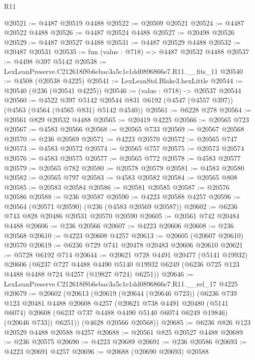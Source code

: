 \begin{lexlean}{R11}
\begin{coremodule}
@20521 := @4487 @20519 @4488
@20522 := @20509 @20521
@20524 := @4487 @20522 @4488
@20526 := @4487 @20524 @4488
@20527 := @20498 @20526
@20529 := @4487 @20527 @4488
@20531 := @4487 @20529 @4488
@20532 := @20487 @20531
@20535 := fun (value : @718) => @4487 @20532 @4488
@20537 := @4498 @397 @5142
@20538 := LexLeanPreserve.C212618f8b6ebac3a5c1e1dd0896866e7.R11.__fits_11
@20540 := @4508 (@20538 @4225)
@20541 := LexLeanStd.Blake3.hexLittle
@20544 := @20540 (@236 (@20541 @4225))
@20546 := (value : @718) -> @20537 @20544
@20560 := @4522
    @397
    @5142
    @20544
    @831
    @6192
    (@4547 (@4557 @397))
    (@4563 (@4564 (@4565 @831) @5142 @4540))
@20561 := @6228 @278
@20564 := @20561 @829 @20532 @4488
@20565 := @20419 @4225
@20566 := @20565 @723
@20567 := @4583 @20566
@20568 := @20565 @733
@20569 := @20567 @20568
@20570 := @236 @20569
@20571 := @4223 @20570
@20572 := @20565 @747
@20573 := @4583 @20572
@20574 := @20565 @757
@20575 := @20573 @20574
@20576 := @4583 @20575
@20577 := @20565 @772
@20578 := @4583 @20577
@20579 := @20565 @782
@20580 := @20578 @20579
@20581 := @4583 @20580
@20582 := @20565 @797
@20583 := @4583 @20582
@20584 := @20565 @808
@20585 := @20583 @20584
@20586 := @20581 @20585
@20587 := @20576 @20586
@20588 := @236 @20587
@20590 := @4223 @20588 @4257
@20596 := @20564 (@20571 @20590) (@236 (@4583 @20569 @20587))
@20602 := @6236 @743 @828 @20486 @20531 @20570 @20590
@20605 := @20561 @742 @20484 @4488
@20606 := @236 @20566
@20607 := @4223 @20606
@20608 := @236 @20568
@20610 := @4223 @20608 @4257
@20613 := @20605 (@20607 @20610) @20570
@20619 := @6236 @729 @741 @20478 @20483 @20606 @20610
@20621 := @5728 @6192 @714
@20644 := @20621
    @728
    @4491
    @20477
    (@5141 @19932)
    @20606
    (@6237
      @727
      @4488
      @4490
      @5140
      @19932
      @6249
      (@6236 @725 @123 @4488 @4488 @724 @4257 (@19827 @724) @6251))
@20646 := LexLeanPreserve.C212618f8b6ebac3a5c1e1dd0896866e7.R11.__rel_17 @4225
@20679 := @20602
    (@20613
      (@20619
        (@20644 (@20646 @723))
        (@6236
          @739
          @123
          @20481
          @4488
          @20608
          @4257
          (@20621
            @738
            @4491
            @20480
            (@5141 @6074)
            @20608
            (@6237 @737 @4488 @4490 @5140 @6074 @6249 @19846)
            (@20646 @733))
          @6251))
      (@4628 @20566 @20568))
@20685 := @6236 @826 @123 @20529 @4488 @20588 @4257
@20688 := @20561 @825 @20527 @4488
@20689 := @236 @20575
@20690 := @4223 @20689
@20691 := @236 @20586
@20693 := @4223 @20691 @4257
@20696 := @20688 (@20690 @20693) @20588

\end{coremodule}
\end{lexlean}
